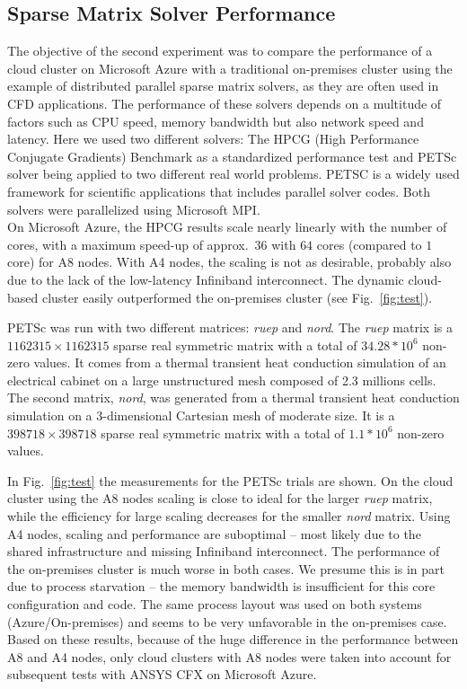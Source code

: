 \documentclass[a4paper,twoside]{article}
\begin{document}
\subsection{Sparse Matrix Solver Performance}
The objective of the second experiment was to compare the performance of a cloud cluster on Microsoft Azure with a traditional on-premises cluster using the example of distributed parallel sparse matrix solvers, as they are often used in CFD applications. The performance of these solvers depends on a multitude of factors such as CPU speed, memory bandwidth but also network speed and latency. Here we used two different solvers: The HPCG (High Performance Conjugate Gradients) Benchmark as a standardized performance test and PETSc solver being applied to two different real world problems. PETSC is a widely used framework for scientific applications that includes parallel solver codes. Both solvers were parallelized using Microsoft MPI.\\
On Microsoft Azure, the HPCG results scale nearly linearly with the number of cores, with a maximum speed-up of approx.~$36$ with $64$ cores (compared to $1$ core) for A8 nodes. With A4 nodes, the scaling is not as desirable, probably also due to the lack of the low-latency Infiniband interconnect. The dynamic cloud-based	cluster easily outperformed the on-premises cluster (see Fig.~\ref{fig:test}). 

PETSc was run with two different matrices: \textit{ruep} and \textit{nord}. The \textit{ruep} matrix is a $1162315 \times 1162315$ sparse real symmetric matrix with a total of $34.28*10^{6}$ non-zero values. It comes from a thermal transient heat conduction simulation of an electrical cabinet on a large unstructured mesh composed of 2.3 millions cells. The second matrix, \textit{nord}, was generated from a thermal transient heat conduction simulation on a 3-dimensional Cartesian mesh of moderate size. It is a $398718 \times 398718$ sparse real symmetric matrix with a total of $1.1*10^{6}$ non-zero values.

In Fig.~\ref{fig:test} the measurements for the PETSc trials are shown. On the cloud cluster using the A8 nodes scaling is close to ideal for the larger \textit{ruep} matrix, while the efficiency for large scaling decreases for the smaller \textit{nord} matrix. Using A4 nodes, scaling and performance are suboptimal -- most likely due to the shared infrastructure and missing Infiniband interconnect.  The performance of the on-premises cluster is much worse in both cases. We presume this is in part due to process starvation -- the memory bandwidth is insufficient for this core configuration and code. The same process layout was used on both systems (Azure/On-premises) and seems to be very unfavorable in the on-premises case.\\
Based on these results, because of the huge difference in the performance between A8 and A4 nodes, only cloud clusters with A8 nodes were taken into account for subsequent tests with ANSYS CFX on Microsoft Azure.
\end{document}
